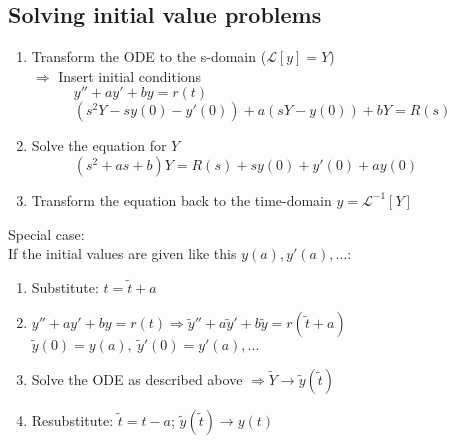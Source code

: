 \subsection{Solving initial value problems}
\begin{enumerate}
    \item Transform the ODE to the s-domain ($\mathcal{L}[y]=Y$)\\
    $\Rightarrow$ Insert initial conditions\\
    $\quad\qquad y''+ay'+by=r(t)$\\
    $\quad\qquad(s^2Y-sy(0)-y'(0))+a(sY-y(0))+bY=R(s)$
    \item Solve the equation for $Y$ \\
    $\quad\qquad (s^2+as+b)Y=R(s)+sy(0)+y'(0)+ay(0)$
    \item Transform the equation back to the time-domain $y=\mathcal{L}^{-1}[Y]$
\end{enumerate}
Special case:\\
If the initial values are given like this $y(a),y'(a),\dots$:
\begin{enumerate}[label=\alph*]
    \item Substitute: $t=\tilde{t}+a$
    \item $y''+ay'+by=r(t) \Rightarrow \tilde{y}''+a\tilde{y}'+b\tilde{y}=r(\tilde{t}+a)$\\
    $\tilde{y}(0)=y(a),\:\tilde{y}'(0)=y'(a),...$
    \item Solve the ODE as described above $\Rightarrow \tilde{Y} \rightarrow \tilde{y}(\tilde{t})$
    \item Resubstitute: $\tilde{t}=t-a$; $\tilde{y}(\tilde{t})\rightarrow y(t)$ 
\end{enumerate}

